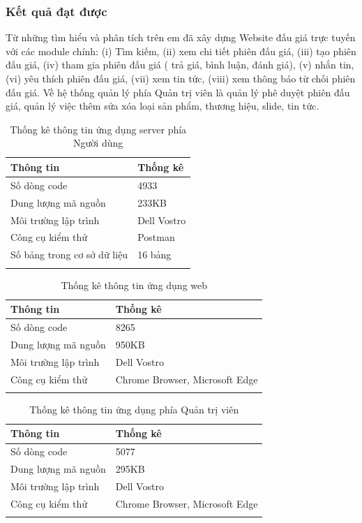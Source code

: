 \documentclass{article}
\begin{document}
\subsubsection{Kết quả đạt được}
Từ những tìm hiểu và phân tích trên em đã xây dựng Website đấu giá trực tuyến với các module chính: (i) Tìm kiếm, (ii) xem chi tiết phiên đấu giá, (iii) tạo phiên đấu giá, (iv) tham gia phiên đấu giá ( trả giá, bình luận, đánh giá), (v) nhắn tin, (vi) yêu thích phiên đấu giá, (vii) xem tin tức, (viii) xem thông báo từ chối phiên đấu giá. Về hệ thống quản lý phía Quản trị viên là quản lý phê duyệt phiên đấu giá, quản lý việc thêm sửa xóa loại sản phẩm, thương hiệu, slide, tin tức.
    \begin{longtable}{| p{}| p{} |} 
    \hline
        \bfseries Thông tin & \bfseries Thống kê\\\hline
        Số dòng code& 4933\\\hline
        Dung lượng mã nguồn&233KB \\\hline
        Môi trường lập trình&Dell Vostro \\\hline
        Công cụ kiểm thử & Postman\\\hline
        Số bảng trong cơ sở dữ liệu  &16 bảng \\\hline
    \caption{Thống kê thông tin ứng dụng server phía Người dùng}
    \label{bang410}
    \end{longtable}
    \begin{longtable}{| p{}| p{} |} 
    \hline
        \bfseries Thông tin & \bfseries Thống kê\\\hline
        Số dòng code& 8265\\\hline
        Dung lượng mã nguồn&950KB \\\hline
        Môi trường lập trình&Dell Vostro \\\hline
        Công cụ kiểm thử & Chrome Browser, Microsoft Edge\\\hline
    \caption{Thống kê thông tin ứng dụng web}
    \label{bang411}
    \end{longtable}
    \begin{longtable}{| p{}| p{} |} 
    \hline
        \bfseries Thông tin & \bfseries Thống kê\\\hline
        Số dòng code& 5077\\\hline
        Dung lượng mã nguồn&295KB \\\hline
        Môi trường lập trình&Dell Vostro \\\hline
        Công cụ kiểm thử & Chrome Browser, Microsoft Edge\\\hline
    \caption{Thống kê thông tin ứng dụng phía Quản trị viên}
    \label{bang412}
    \end{longtable}
\end{document}
